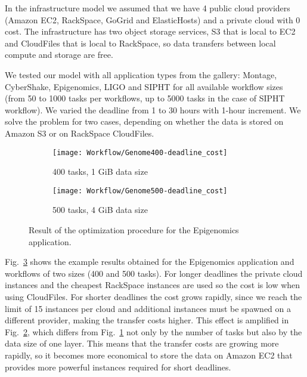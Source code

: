 {    In the infrastructure model we assumed that we have 4 public cloud providers (Amazon EC2, RackSpace, GoGrid and ElasticHosts) and a private cloud with 0 cost. The infrastructure has two object storage services, S3 that is local to EC2 and CloudFiles that is local to RackSpace, so data transfers between local compute and storage are free. 

    We tested our model with all application types from the gallery: Montage, CyberShake, Epigenomics, LIGO and SIPHT for all available workflow sizes (from 50 to 1000 tasks per workflows, up to 5000 tasks in the case of SIPHT workflow). We varied the deadline from 1 to 30 hours with 1-hour increment. We solve the problem for two cases, depending on whether the data is stored on Amazon S3 or on RackSpace CloudFiles.
  
    \begin{figure}[b] 
       \centering
       \begin{subfigure}[b]{0.49\textwidth}  
         \texttt{[image: Workflow/Genome400-deadline\_cost]}
         \caption{400 tasks, 1 GiB data size}
         \label{fig:workflow:genome-400}
       \end{subfigure}
       \begin{subfigure}[b]{0.49\textwidth}
         \texttt{[image: Workflow/Genome500-deadline\_cost]}
         \caption{500 tasks, 4 GiB data size}
         \label{fig:workflow:genome-500}
       \end{subfigure}
       \caption{\label{fig:workflow:genome}Result of the optimization procedure for the Epigenomics application.}
    \end{figure}  

    Fig.~\ref{fig:workflow:genome} shows the example results obtained for the Epigenomics application and workflows of two sizes (400 and 500 tasks). For longer deadlines the private cloud instances and the cheapest RackSpace instances are used so the cost is low when using CloudFiles. For shorter deadlines the cost grows rapidly, since we reach the limit of 15 instances per cloud and additional instances must be spawned on a different provider, making the transfer costs higher. This effect is amplified in Fig.~\ref{fig:workflow:genome-500}, which differs from Fig.~\ref{fig:workflow:genome-400} not only by the number of tasks but also by the data size of one layer. This means that the transfer costs are growing more rapidly, so it becomes more economical to store the data on Amazon EC2 that provides more powerful instances required for short deadlines.
    
}
